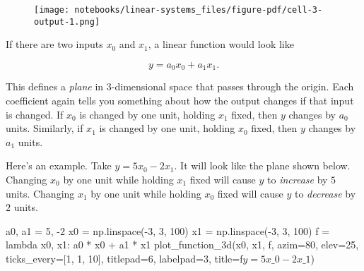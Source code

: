 \documentclass[
  letterpaper,
  DIV=11,
  numbers=noendperiod]{scrreprt}
\newenvironment{Shaded}{\begin{snugshade}}{\end{snugshade}}
\newcommand{\DecValTok}[1]{\textcolor[rgb]{0.68,0.00,0.00}{#1}}
\newcommand{\KeywordTok}[1]{\textcolor[rgb]{0.00,0.23,0.31}{#1}}
\newcommand{\NormalTok}[1]{\textcolor[rgb]{0.00,0.23,0.31}{#1}}
\newcommand{\OperatorTok}[1]{\textcolor[rgb]{0.37,0.37,0.37}{#1}}
\newcommand{\SpecialStringTok}[1]{\textcolor[rgb]{0.13,0.47,0.30}{#1}}
\begin{document}
\begin{figure}[H]

{\centering \texttt{[image: notebooks/linear-systems\_files/figure-pdf/cell-3-output-1.png]}

}

\end{figure}

If there are two inputs \(x_0\) and \(x_1\), a linear function would
look like

\[y = a_0 x_0 + a_1 x_1.\]

This defines a \emph{plane} in 3-dimensional space that passes through
the origin. Each coefficient again tells you something about how the
output changes if that input is changed. If \(x_0\) is changed by one
unit, holding \(x_1\) fixed, then \(y\) changes by \(a_0\) units.
Similarly, if \(x_1\) is changed by one unit, holding \(x_0\) fixed,
then \(y\) changes by \(a_1\) units.

Here's an example. Take \(y = 5x_0 - 2x_1\). It will look like the plane
shown below. Changing \(x_0\) by one unit while holding \(x_1\) fixed
will cause \(y\) to \emph{increase} by \(5\) units. Changing \(x_1\) by
one unit while holding \(x_0\) fixed will cause \(y\) to \emph{decrease}
by \(2\) units.

\begin{Shaded}
\begin{Highlighting}[]
\NormalTok{a0, a1 }\OperatorTok{=} \DecValTok{5}\NormalTok{, }\OperatorTok{{-}}\DecValTok{2}
\NormalTok{x0 }\OperatorTok{=}\NormalTok{ np.linspace(}\OperatorTok{{-}}\DecValTok{3}\NormalTok{, }\DecValTok{3}\NormalTok{, }\DecValTok{100}\NormalTok{)}
\NormalTok{x1 }\OperatorTok{=}\NormalTok{ np.linspace(}\OperatorTok{{-}}\DecValTok{3}\NormalTok{, }\DecValTok{3}\NormalTok{, }\DecValTok{100}\NormalTok{)}
\NormalTok{f }\OperatorTok{=} \KeywordTok{lambda}\NormalTok{ x0, x1: a0 }\OperatorTok{*}\NormalTok{ x0 }\OperatorTok{+}\NormalTok{ a1 }\OperatorTok{*}\NormalTok{ x1}
\NormalTok{plot\_function\_3d(x0, x1, f, azim}\OperatorTok{=}\DecValTok{80}\NormalTok{, elev}\OperatorTok{=}\DecValTok{25}\NormalTok{, ticks\_every}\OperatorTok{=}\NormalTok{[}\DecValTok{1}\NormalTok{, }\DecValTok{1}\NormalTok{, }\DecValTok{10}\NormalTok{],}
\NormalTok{                 titlepad}\OperatorTok{=}\DecValTok{6}\NormalTok{, labelpad}\OperatorTok{=}\DecValTok{3}\NormalTok{, title}\OperatorTok{=}\SpecialStringTok{f\textquotesingle{}$y=5x\_0 {-} 2x\_1$\textquotesingle{}}\NormalTok{)}
\end{Highlighting}
\end{Shaded}
\end{document}
